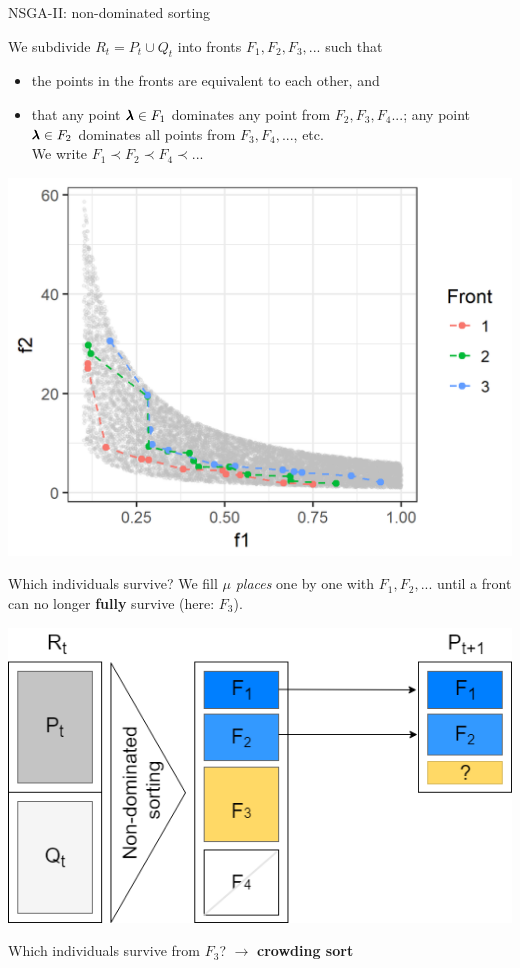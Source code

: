 \begin{frame}[allowframebreaks]{NSGA-II: non-dominated sorting}



\begin{footnotesize}
We subdivide $R_t = P_t \cup Q_t$ into fronts $F_1, F_2, F_3, ...$ such that

\begin{itemize}
\item the points in the fronts are equivalent to each other, and
\item that any point $\pmb{\lambda} \in F_1$ dominates any point from $F_2, F_3, F_4...$; any point $\pmb{\lambda} \in F_2$ dominates all points from $F_3, F_4, ...$, etc. \\
We write $F_1 \prec F_2 \prec F_4 \prec ... $
\end{itemize}
\end{footnotesize}
    \vspace{-0.5cm}
\begin{center}
\includegraphics[width = 0.4\linewidth]{images/NSGA2_NDS.png}
\end{center}

\framebreak

Which individuals survive? We fill $\mu$ \textit{places} one by one with $F_1, F_2, ...$ until a front can no longer \textbf{fully} survive (here: $F_3$).

\begin{center}
\includegraphics[width = 0.45\linewidth]{images/NSGA2_2.png}
\end{center}

Which individuals survive from $F_3$? $\to$ \textbf{crowding sort}

\end{frame}

